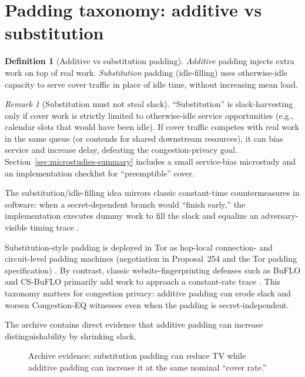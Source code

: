 \documentclass[11pt]{article}
\theoremstyle{definition}
\newtheorem{definition}{Definition}
\theoremstyle{remark}
\newtheorem{remark}{Remark}
\begin{document}
\section{Padding taxonomy: additive vs substitution}
\begin{definition}[Additive vs substitution padding]
\emph{Additive} padding injects extra work on top of real work.
\emph{Substitution} padding (idle-filling) uses otherwise-idle capacity to serve cover traffic in place of idle time, without increasing mean load.
\end{definition}

\begin{remark}[Substitution must not steal slack]
``Substitution'' is slack-harvesting only if cover work is strictly limited to otherwise-idle service opportunities (e.g., calendar slots that would have been idle).
If cover traffic competes with real work in the same queue (or contends for shared downstream resources), it can bias service and increase delay, defeating the congestion-privacy goal.
Section~\ref{sec:microstudies-summary} includes a small service-bias microstudy and an implementation checklist for ``preemptible'' cover.
\end{remark}

The substitution/idle-filling idea mirrors classic constant-time countermeasures in software: when a secret-dependent branch would ``finish early,'' the implementation executes dummy work to fill the slack and equalize an adversary-visible timing trace \cite{agat2000,mishra_fallthrough2025}.

Substitution-style padding is deployed in Tor as hop-local connection- and circuit-level padding machines (negotiation in Proposal~254 and the Tor padding specification) \cite{torproposal254,torpaddingspec}.
By contrast, classic website-fingerprinting defenses such as BuFLO and CS-BuFLO primarily add work to approach a constant-rate trace \cite{dyer2012peekaboo,csbuflo}.
This taxonomy matters for congestion privacy: additive padding can erode slack and worsen Congestion-EQ witnesses even when the padding is secret-independent.

The archive contains direct evidence that additive padding can increase distinguishability by shrinking slack.

\begin{figure}[t]
\centering
{}
\caption{Archive evidence: substitution padding can reduce TV while additive padding can increase it at the same nominal ``cover rate.''}
\label{fig:tax}
\end{figure}
\end{document}
